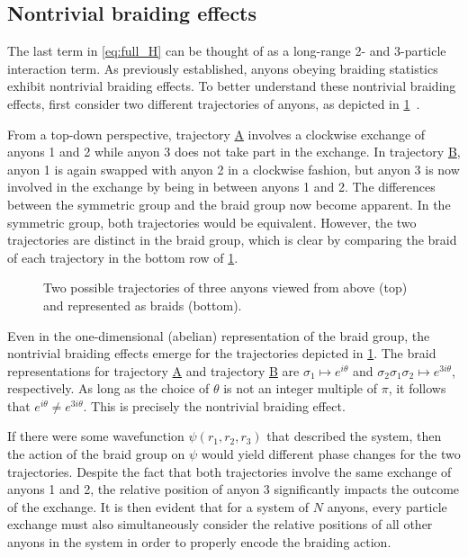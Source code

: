 \subsection{Nontrivial braiding effects}

The last term in \cref{eq:full_H} can be thought of as a long-range 2- and 3-particle interaction term. As previously established, anyons obeying braiding statistics exhibit nontrivial braiding effects. To better understand these nontrivial braiding effects, first consider two different trajectories of anyons, as depicted in \cref{fig:anyon_trajectores}~\cite{Khare2005}. 

From a top-down perspective, trajectory \hyperref[traj:A]{A} involves a clockwise exchange of anyons 1 and 2 while anyon 3 does not take part in the exchange. In trajectory \hyperref[traj:B]{B}, anyon 1 is again swapped with anyon 2 in a clockwise fashion, but anyon 3 is now involved in the exchange by being in between anyons 1 and 2. The differences between the symmetric group and the braid group now become apparent. In the symmetric group, both trajectories would be equivalent. However, the two trajectories are distinct in the braid group, which is clear by comparing the braid of each trajectory in the bottom row of \cref{fig:anyon_trajectores}.

\begin{figure}[htbp]
    \centering
    
    \caption{Two possible trajectories of three anyons viewed from above (top) and represented as braids (bottom).}\label{fig:anyon_trajectores}
\end{figure}

Even in the one-dimensional (abelian) representation of the braid group, the nontrivial braiding effects emerge for the trajectories depicted in \cref{fig:anyon_trajectores}. The braid representations for trajectory \hyperref[traj:A]{A} and trajectory \hyperref[traj:B]{B} are $\sigma_1\mapsto e^{i\theta}$ and $\sigma_2\sigma_1\sigma_2\mapsto e^{3i\theta}$, respectively. As long as the choice of $\theta$ is not an integer multiple of $\pi$, it follows that $e^{i\theta}\neq e^{3i\theta}$. This is precisely the nontrivial braiding effect.

If there were some wavefunction $\psi(r_1,r_2,r_3)$ that described the system, then the action of the braid group on $\psi$ would yield different phase changes for the two trajectories.
Despite the fact that both trajectories involve the same exchange of anyons 1 and 2, the relative position of anyon 3 significantly impacts the outcome of the exchange. It is then evident that for a system of $N$ anyons, every particle exchange must also simultaneously consider the relative positions of all other anyons in the system in order to properly encode the braiding action.

